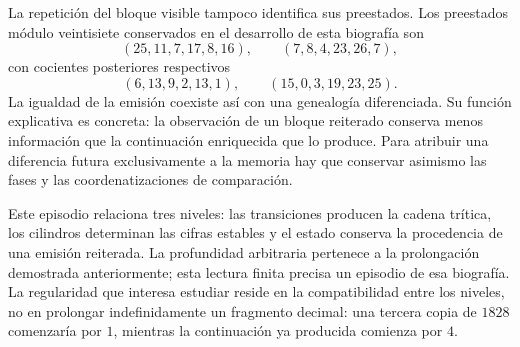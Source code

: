 La repetición del bloque visible tampoco identifica sus preestados.
Los preestados módulo veintisiete conservados en el desarrollo de
esta biografía son
\[
 (25,11,7,17,8,16),\qquad (7,8,4,23,26,7),
\]
con cocientes posteriores respectivos
\[
 (6,13,9,2,13,1),\qquad (15,0,3,19,23,25).
\]
La igualdad de la emisión coexiste así con una genealogía diferenciada.
Su función explicativa es concreta: la observación de un bloque
reiterado conserva menos información que la continuación enriquecida
que lo produce. Para atribuir una diferencia futura exclusivamente
a la memoria hay que conservar asimismo las fases y las coordenatizaciones de
comparación.

Este episodio relaciona tres niveles: las transiciones producen la
cadena trítica, los cilindros determinan las cifras estables y el
estado conserva la procedencia de una emisión reiterada. La
profundidad arbitraria pertenece a la prolongación demostrada
anteriormente; esta lectura finita precisa un episodio de esa
biografía. La regularidad que interesa estudiar reside en la
compatibilidad entre los niveles, no en prolongar indefinidamente
un fragmento decimal: una tercera copia de \(1828\) comenzaría por
\(1\), mientras la continuación ya producida comienza por \(4\).
